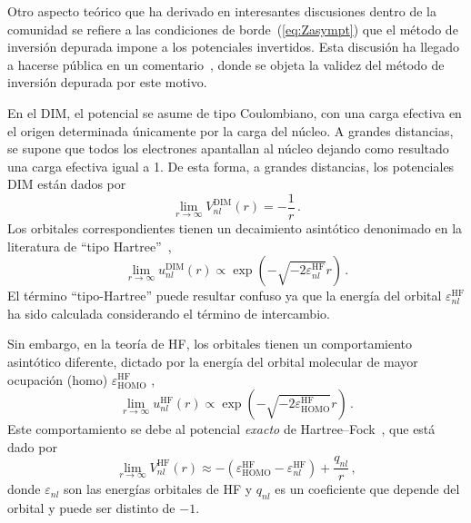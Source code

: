 Otro aspecto teórico que ha derivado en interesantes discusiones dentro 
de la comunidad se refiere a las condiciones de borde~(\ref{eq:Zasympt}) 
que el método de inversión depurada impone a los potenciales invertidos. 
Esta discusión ha llegado a hacerse pública en un 
comentario~\cite{Cinal:19}, donde se objeta la validez del método de 
inversión depurada por este motivo.

En el DIM, el potencial se asume de tipo Coulombiano, con una carga 
efectiva en el origen determinada únicamente por la carga del núcleo. A 
grandes distancias, se supone que todos los electrones apantallan al 
núcleo dejando como resultado una carga efectiva igual a 1. De esta 
forma, a grandes distancias, los potenciales DIM están dados por
\begin{equation}
\lim_{r\rightarrow\infty} V_{nl}^{\mathrm{DIM}}(r) = -\frac{1}{r}\,.
\label{eq:VDIMasympt}
\end{equation}
Los orbitales correspondientes tienen un decaimiento asintótico 
denonimado en la literatura de ``tipo Hartree''~\cite{Casida:89},
\begin{equation}
\lim_{r \rightarrow \infty} u_{nl}^{\mathrm{DIM}}(r) \propto
\exp(- \sqrt{- 2 \varepsilon_{nl}^{\mathrm{HF}} } r ) \,.
\label{eq:uDIMasympt}
\end{equation}
El término ``tipo-Hartree'' puede resultar confuso ya que la energía 
del orbital $\varepsilon_{nl}^{\mathrm{HF}}$ ha sido calculada 
considerando el término de intercambio. 

Sin embargo, en la teoría de HF, los orbitales tienen un comportamiento 
asintótico diferente, dictado por la energía del orbital molecular de 
mayor ocupación (\acs{homo}) $\varepsilon_{\mathrm{HOMO}}^{\mathrm{HF}}$ 
\cite{Handy:69,Handler:80,Ishida:92},
\begin{equation}
\lim_{r \rightarrow \infty} u_{nl}^{\mathrm{HF}}(r) \propto
\exp(- \sqrt{- 2 \varepsilon_{\mathrm{HOMO}}^{\mathrm{HF}} } r )  \, .
\label{eq:uHFasympt}
\end{equation}
Este comportamiento se debe al potencial \textit{exacto} de 
Hartree--Fock~\cite{Cinal:10}, que está dado por
\begin{equation}
\lim_{r\rightarrow\infty} V_{nl}^{\mathrm{HF}}(r) \approx
-\left(\varepsilon_{\mathrm{HOMO}}^{\mathrm{HF}}
-\varepsilon_{nl}^{\mathrm{HF}}\right)+\frac{q_{nl}}{r}\,,
\label{eq:VHFasympt}
\end{equation}
donde $\varepsilon_{nl}$ son las energías orbitales de HF y $q_{nl}$ es 
un coeficiente que depende del orbital y puede ser distinto de $-1$.

